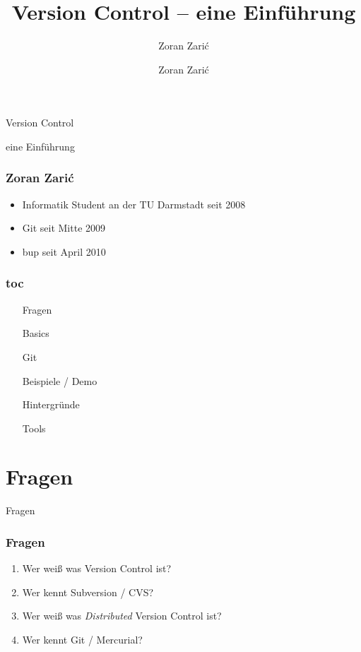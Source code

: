 \documentclass[]{beamer}
\begin{document}

\title[Version Control]{Version Control -- eine Einführung}
\subtitle[Zoran Zari\'c]{Zoran Zari\'c}
\author[Zoran Zari\'c]{Zoran Zari\'c}

\begin{frame}
	\fontsize{30}{10}\selectfont Version Control
	\vspace*{0.5cm}

	\fontsize{20}{10}\selectfont eine Einführung
\end{frame}

\begin{frame}
	\frametitle{Zoran Zari\'c}
	\begin{itemize}
		\item
			Informatik Student an der TU Darmstadt seit 2008
		\item
			Git seit Mitte 2009
		\item
			bup seit April 2010
	\end{itemize}
\end{frame}

\begin{frame}
	\frametitle{toc}
	\begin{enumerate}
		\item
			Fragen
		\item
			Basics
		\item
			Git
		\item
			Beispiele / Demo
		\item
			Hintergründe
		\item
			Tools
	\end{enumerate}
\end{frame}

\section{Fragen}
\begin{frame}
	\fontsize{30}{10}\selectfont Fragen
\end{frame}

\begin{frame}
	\frametitle{Fragen}
	\begin{enumerate}
		\item<1->
			Wer weiß was Version Control ist?
		\item<2->
			Wer kennt Subversion / CVS?
		\item<3->
			Wer weiß was \emph{Distributed} Version Control ist?
		\item<4->
			Wer kennt Git / Mercurial?

	\end{enumerate}
\end{frame}
\end{document}
